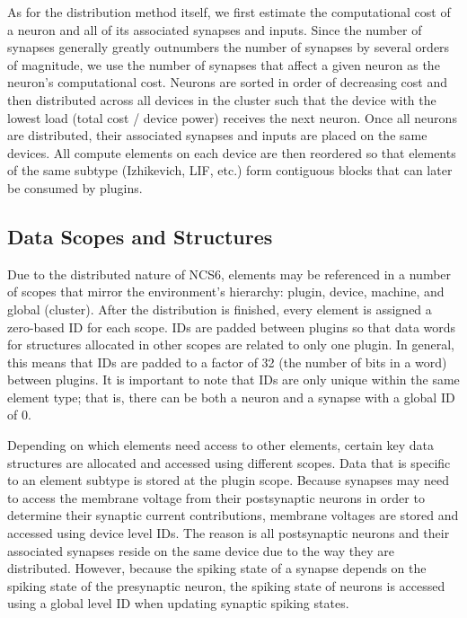 As for the distribution method itself, we first estimate the computational
cost of a neuron and all of its associated synapses and inputs. Since the
number of synapses generally greatly outnumbers the number of synapses by
several orders of magnitude, we use the number of synapses that affect
a given neuron as the neuron's computational cost. Neurons are  sorted
in order of decreasing cost and then distributed across all devices
in the cluster such that the device with the lowest load (total cost /
device power) receives the next neuron. Once all neurons are distributed,
their associated synapses and inputs are placed on the same devices. All
compute elements on each device are then reordered so that elements of
the same subtype (Izhikevich, LIF, etc.)  form contiguous blocks that
can later be consumed by plugins.

\subsection{Data Scopes and Structures}

Due to the distributed nature of NCS6, elements may be referenced in a
number of scopes that mirror the environment's hierarchy: plugin, device,
machine, and global (cluster). After the distribution is finished, every
element is assigned a zero-based ID for each scope. IDs are padded between
plugins so that data words for structures allocated in other scopes are
related to only one plugin. In general, this means that IDs are padded
to a factor of 32 (the number of bits in a word) between plugins. It is
important to note that IDs are only unique within the same element type;
that is, there can be both a neuron and a synapse with a global ID of 0.

Depending on which elements need access to other elements, certain
key data structures are allocated and accessed using different
scopes. Data that is specific to an element subtype is stored at the
plugin scope. Because synapses may need to access the membrane voltage
from their postsynaptic neurons in order to determine their synaptic
current contributions, membrane voltages are stored and accessed using
device level IDs. The reason is all postsynaptic neurons and their
associated synapses reside on the same device due to the way they are
distributed. However, because the spiking state of a synapse depends on
the spiking state of the presynaptic neuron, the spiking state of neurons
is accessed using a global level ID when updating synaptic spiking states.

